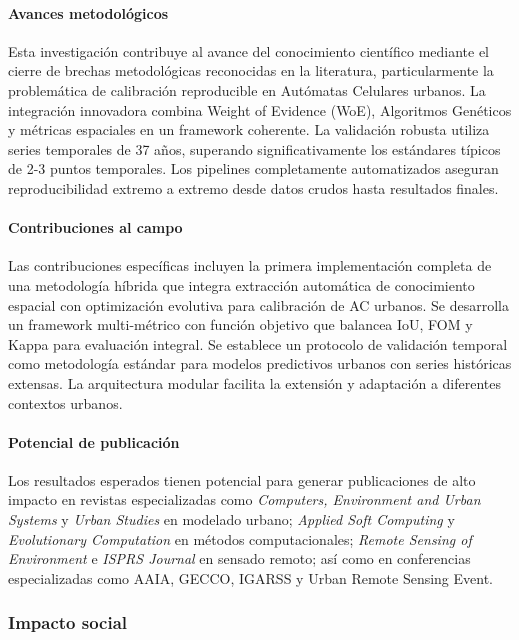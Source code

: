 \paragraph{Avances metodológicos}

Esta investigación contribuye al avance del conocimiento científico mediante el cierre de brechas metodológicas reconocidas en la literatura, particularmente la problemática de calibración reproducible en Autómatas Celulares urbanos. La integración innovadora combina Weight of Evidence (WoE), Algoritmos Genéticos y métricas espaciales en un framework coherente. La validación robusta utiliza series temporales de 37 años, superando significativamente los estándares típicos de 2-3 puntos temporales. Los pipelines completamente automatizados aseguran reproducibilidad extremo a extremo desde datos crudos hasta resultados finales.

\paragraph{Contribuciones al campo}

Las contribuciones específicas incluyen la primera implementación completa de una metodología híbrida que integra extracción automática de conocimiento espacial con optimización evolutiva para calibración de AC urbanos. Se desarrolla un framework multi-métrico con función objetivo que balancea IoU, FOM y Kappa para evaluación integral. Se establece un protocolo de validación temporal como metodología estándar para modelos predictivos urbanos con series históricas extensas. La arquitectura modular facilita la extensión y adaptación a diferentes contextos urbanos.

\paragraph{Potencial de publicación}

Los resultados esperados tienen potencial para generar publicaciones de alto impacto en revistas especializadas como \emph{Computers, Environment and Urban Systems} y \emph{Urban Studies} en modelado urbano; \emph{Applied Soft Computing} y \emph{Evolutionary Computation} en métodos computacionales; \emph{Remote Sensing of Environment} e \emph{ISPRS Journal} en sensado remoto; así como en conferencias especializadas como AAIA, GECCO, IGARSS y Urban Remote Sensing Event.

\subsubsection{Impacto social}

